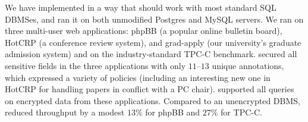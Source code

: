 
 

We have implemented \name{} in a way that should work with most
standard SQL DBMSes, and ran it on both unmodified Postgres and MySQL
servers. We ran \name{} on three multi-user web applications: phpBB (a
popular online bulletin board), HotCRP (a conference review system),
and grad-apply (our university's graduate admission system) and on the
industry-standard TPC-C benchmark. \name{} secured all sensitive
fields in the three applications with only $11$--$13$ unique
annotations, which expressed a variety of policies (including an
interesting new one in HotCRP for handling papers in conflict with a
PC chair).  \name{} supported all queries on encrypted data from these
applications.  Compared to an unencrypted DBMS, \name{} reduced
throughput by a modest $13\%$ for phpBB and $27\%$ for TPC-C\@.

 




